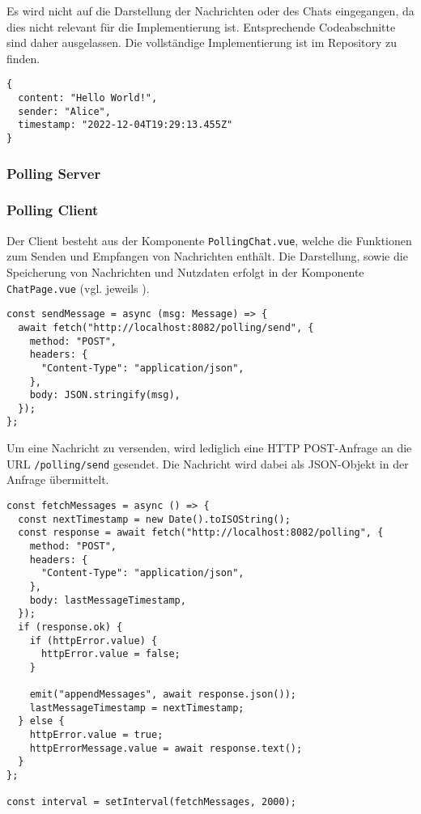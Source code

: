 \documentclass[sigplan, screen]{acmart}
\begin{document}
Es wird nicht auf die Darstellung der Nachrichten oder des Chats eingegangen, da dies nicht relevant für die Implementierung ist.
Entsprechende Codeabschnitte sind daher ausgelassen.
Die vollständige Implementierung ist im Repository \cite[\texttt{code/client/src/components/PollingChat.vue}]{wagner_seminar2022_2022} zu finden.


\begin{lstlisting}[caption={Beispielhafte Nachricht}, label={lst:polling-json}, numbers=none]
{
  content: "Hello World!",
  sender: "Alice",
  timestamp: "2022-12-04T19:29:13.455Z"
}
\end{lstlisting}

\subsubsection{Polling Server}



\subsubsection{Polling Client}

Der Client besteht aus der Komponente \texttt{PollingChat.vue}, welche die Funktionen zum Senden und Empfangen von Nachrichten enthält.
Die Darstellung, sowie die Speicherung von Nachrichten und Nutzdaten erfolgt in der Komponente \texttt{ChatPage.vue} (vgl. jeweils \cite[\texttt{code/client/src/components/}]{wagner_seminar2022_2022}).

\begin{lstlisting}[caption={Polling Client: Nachricht senden}, label={lst:polling-server-send-message}, firstnumber=18]
const sendMessage = async (msg: Message) => {
  await fetch("http://localhost:8082/polling/send", {
    method: "POST",
    headers: {
      "Content-Type": "application/json",
    },
    body: JSON.stringify(msg),
  });
};
\end{lstlisting}

Um eine Nachricht zu versenden, wird lediglich eine HTTP POST-Anfrage an die URL \texttt{/polling/send} gesendet.
Die Nachricht wird dabei als JSON-Objekt in der Anfrage übermittelt.

\begin{lstlisting}[caption={Polling Client: Nachrichten abfragen}, label={lst:polling-server-get-messages}, firstnumber=29]
const fetchMessages = async () => {
  const nextTimestamp = new Date().toISOString();
  const response = await fetch("http://localhost:8082/polling", {
    method: "POST",
    headers: {
      "Content-Type": "application/json",
    },
    body: lastMessageTimestamp,
  });
  if (response.ok) {
    if (httpError.value) {
      httpError.value = false;
    }
    
    emit("appendMessages", await response.json());
    lastMessageTimestamp = nextTimestamp;
  } else {
    httpError.value = true;
    httpErrorMessage.value = await response.text();
  }
};

const interval = setInterval(fetchMessages, 2000);
\end{lstlisting}
\end{document}
